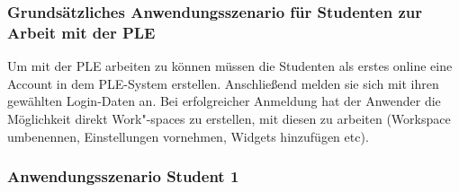 \subsubsection*{Grundsätzliches Anwendungsszenario für Studenten zur Arbeit mit der PLE}
Um mit der PLE arbeiten zu können müssen die Studenten als erstes online eine Account in dem PLE-System erstellen. Anschließend melden sie sich mit ihren gewählten Login-Daten an. Bei erfolgreicher Anmeldung hat der Anwender die Möglichkeit direkt Work"-spaces zu erstellen, mit diesen zu arbeiten (Workspace umbenennen, Einstellungen vornehmen, Widgets hinzufügen etc).

\subsubsection*{Anwendungsszenario Student 1}
